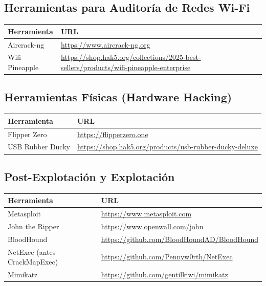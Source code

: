 \documentclass[a4paper, 11pt]{article}
\begin{document}
\subsection*{Herramientas para Auditoría de Redes Wi-Fi}
\begin{table}[H]
\centering
\begin{tabular}{|m{5cm}|m{10cm}|}
\hline
\textbf{Herramienta} & \textbf{URL} \\
\hline
Aircrack-ng & \url{https://www.aircrack-ng.org} \\
\hline
Wifi Pineapple & \url{https://shop.hak5.org/collections/2025-best-sellers/products/wifi-pineapple-enterprise} \\
\hline
\end{tabular}
\end{table}

\subsection*{Herramientas Físicas (Hardware Hacking)}
\begin{table}[H]
\centering
\begin{tabular}{|m{5cm}|m{10cm}|}
\hline
\textbf{Herramienta} & \textbf{URL} \\
\hline
Flipper Zero & \url{https://flipperzero.one} \\
\hline
USB Rubber Ducky & \url{https://shop.hak5.org/products/usb-rubber-ducky-deluxe} \\
\hline
\end{tabular}
\end{table}

\subsection*{Post-Explotación y Explotación}
\begin{table}[H]
\centering
\begin{tabular}{|m{5cm}|m{10cm}|}
\hline
\textbf{Herramienta} & \textbf{URL} \\
\hline
Metasploit & \url{https://www.metasploit.com} \\
\hline
John the Ripper & \url{https://www.openwall.com/john} \\
\hline
BloodHound & \url{https://github.com/BloodHoundAD/BloodHound} \\
\hline
NetExec (antes CrackMapExec) & \url{https://github.com/Pennyw0rth/NetExec} \\
\hline
Mimikatz & \url{https://github.com/gentilkiwi/mimikatz} \\
\hline
\end{tabular}
\end{table}
\end{document}
